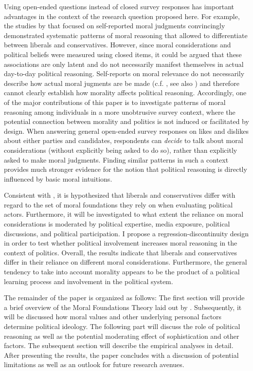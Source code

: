 \documentclass[12pt]{article}
\begin{document}
Using open-ended questions instead of closed survey responses has important advantages in the context of the research question proposed here. For example, the studies by \citet{graham2009liberals} that focused on self-reported moral judgments convincingly demonstrated systematic patterns of moral reasoning that allowed to differentiate between liberals and conservatives. However, since moral considerations and political beliefs were measured using closed items, it could be argued that these associations are only latent and do not necessarily manifest themselves in actual day-to-day political reasoning. Self-reports on moral relevance do not necessarily describe how actual moral jugments are be made (c.f. \citealt[1031]{graham2009liberals}, see also \citealt{clifford2015moral}) and therefore cannot clearly establish how morality affects political reasoning.  Accordingly, one of the major contributions of this paper is to investigate patterns of moral reasoning among individuals in a more unobtrusive survey context, where the potential connection between morality and politics is not induced or facilitated by design. When answering general open-ended survey responses on likes and dislikes about either parties and candidates, respondents can \textit{decide} to talk about moral considerations (without explicitly being asked to do so), rather than explicitly asked to make moral judgments. Finding similar patterns in such a context provides much stronger evidence for the notion that political reasoning is directly influenced by basic moral intuitions.

Consistent with \citet{graham2009liberals}, it is hypothesized that liberals and conservatives differ with regard to the set of moral foundations they rely on when evaluating political actors. Furthermore, it will be investigated to what extent the reliance on moral considerations is moderated by political expertise, media exposure, political discussions, and political participation. I propose a regression-discontinuity design in order to test whether political involvement increases moral reasoning in the context of politics. Overall, the results indicate that liberals and conservatives differ in their reliance on different moral considerations. Furthermore, the general tendency to take into account morality appears to be the product of a political learning process and involvement in the political system.

The remainder of the paper is organized as follows: The first section will provide a brief overview of the Moral Foundations Theory laid out by \citet{haidt2008moral}. Subsequently, it will be discussed how moral values and other underlying personal factors determine political ideology. The following part will discuss the role of political reasoning as well as the potential moderating effect of sophistication and other factors. The subsequent section will describe the empirical analyses in detail. After presenting the results, the paper concludes with a discussion of potential limitations as well as an outlook for future research avenues.
\end{document}
